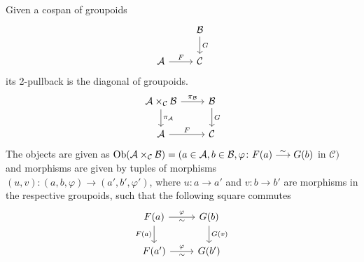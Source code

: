 \begin{construction}
    Given a cospan of groupoids 
    \[
    \begin{tikzcd}
        &
        \mathcal{B}
        \ar[d, " G "]
        \\
        \mathcal{ A }
        \ar[r, " F "]
        &
        \mathcal{ C }
    \end{tikzcd}
    \]
    its 2-pullback is the diagonal of groupoids.
    \[
    \begin{tikzcd}
        \mathcal{ A } \times_{ \mathcal{ C } } \mathcal{ B } 
        \ar[r, " \pi_{ \mathcal{ B }} "]
        \ar[d, " \pi_{ \mathcal{ A }} "]
        &
        \mathcal{ B }
        \ar[ d , " G " ]
        \\
        \mathcal{ A }
        \ar[r, " F " ]
        &
        \mathcal{ C }
    \end{tikzcd}
    \]
    The objects are given as $ \Ob ( \mathcal{ A } \times_\mathcal{ C } \mathcal{ B } ) = ( a \in \mathcal{ A } , b \in \mathcal{ B }, \varphi \colon F ( a ) \isomorphism G ( b ) $ in $ \mathcal{ C } )$ and morphisms are given by tuples of morphisms $ ( u , v ) \colon ( a , b, \varphi ) \to ( a' , b' , \varphi' ) $, where $ u \colon a \to a' $ and $ v \colon b \to b '$ are morphisms in the respective groupoids, such that the following square commutes
    \[
    \begin{tikzcd}
        F ( a ) 
        \ar[r, "\varphi" , " \sim "']
        \ar[d, "F( a )"']
        &
        G ( b )
        \ar[d, " G ( v )"]
        \\
        F ( a' )
        \ar[r, "\varphi", "\sim"']
        &
        G(b')
    \end{tikzcd}
    \]
\end{construction}